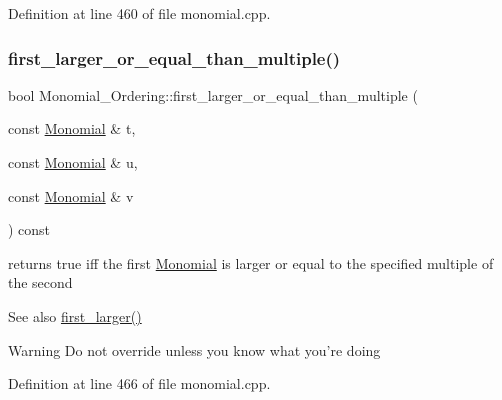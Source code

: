 Definition at line 460 of file monomial.\+cpp.

\mbox{\label{class_monomial___ordering_ad4af4c79cf46666222fe30fdd4ceb45e}} 
\subsubsection{\texorpdfstring{first\+\_\+larger\+\_\+or\+\_\+equal\+\_\+than\+\_\+multiple()}{first\_larger\_or\_equal\_than\_multiple()}}
{\footnotesize\ttfamily bool Monomial\+\_\+\+Ordering\+::first\+\_\+larger\+\_\+or\+\_\+equal\+\_\+than\+\_\+multiple (\begin{DoxyParamCaption}\item[{const \hyperlink{class_monomial}{Monomial} \&}]{t,  }\item[{const \hyperlink{class_monomial}{Monomial} \&}]{u,  }\item[{const \hyperlink{class_monomial}{Monomial} \&}]{v }\end{DoxyParamCaption}) const}



returns {\ttfamily true} iff the first \hyperlink{class_monomial}{Monomial} is larger or equal to the specified multiple of the second 

\begin{DoxySeeAlso}{See also}
\hyperlink{class_monomial___ordering_aed41fe82e1ca5cd287a93d287fee7c20}{first\+\_\+larger()} 
\end{DoxySeeAlso}
\begin{DoxyWarning}{Warning}
Do not override unless you know what you're doing 
\end{DoxyWarning}


Definition at line 466 of file monomial.\+cpp.

\mbox{\label{class_monomial___ordering_ab6c02638f87382f7a9a95b994e9a5dfb}} 
